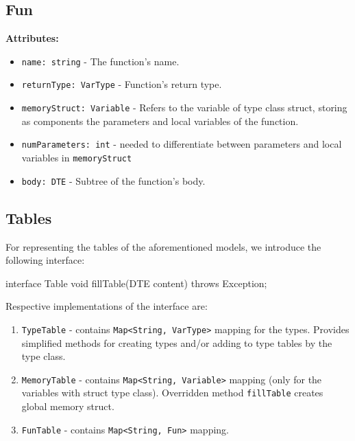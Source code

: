 \subsection{Fun}\label{subsec:fun}
\textbf{Attributes:}
\begin{itemize}
    \item \verb+name: string+ - The function's name.
    \item \verb+returnType: VarType+ - Function's return type.
    \item \verb+memoryStruct: Variable+ - Refers to the variable of type class struct, storing as components the parameters
    and local variables of the function.
    \item \verb+numParameters: int+ - needed to differentiate between parameters and local variables in \verb+memoryStruct+
    \item \verb+body: DTE+ - Subtree of the function's body.
\end{itemize}

\subsection{Tables}\label{subsec:tables}
For representing the tables of the aforementioned models, we introduce the following interface:
\begin{codeblock}
    interface Table {
        void fillTable(DTE content) throws Exception;
    }
\end{codeblock}
Respective implementations of the interface are:
\begin{enumerate}
    \item \verb+TypeTable+ - contains \verb+Map<String, VarType>+ mapping for the types.
    Provides simplified methods for creating types and/or adding to type tables by the type class.
    \item \verb+MemoryTable+ - contains \verb+Map<String, Variable>+ mapping (only for the variables with struct type class).
    Overridden method \verb+fillTable+ creates global memory struct.
    \item \verb+FunTable+ - contains \verb+Map<String, Fun>+ mapping.
\end{enumerate}


